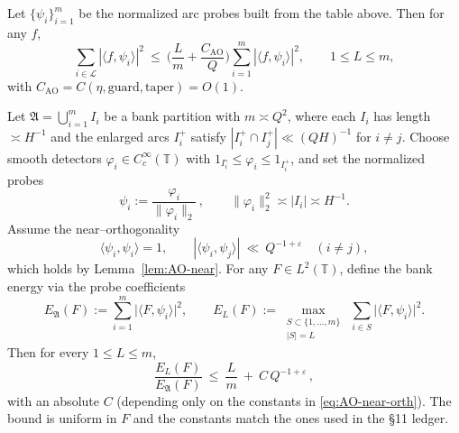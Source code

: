 \begin{proposition}\label{prop:AO-const}
Let $\{\psi_i\}_{i=1}^m$ be the normalized arc probes built from the table above. 
Then for any $f$,
\[
\sum_{i\in\mathcal L} |\langle f,\psi_i\rangle|^2
\ \le\
\Big(\frac{L}{m}+\frac{C_{\mathrm{AO}}}{Q}\Big)
\sum_{i=1}^{m} |\langle f,\psi_i\rangle|^2,
\qquad 1\le L\le m,
\]
with $C_{\mathrm{AO}}=C(\eta,\text{guard},\text{taper})=O(1)$.
\end{proposition}


\begin{theorem}\label{thm:AO-dispersion-nohot}
Let $\mathfrak A=\bigcup_{i=1}^{m} I_i$ be a bank partition with $m\asymp Q^2$, where each $I_i$ has length $\asymp H^{-1}$ and the enlarged arcs $I_i^+$ satisfy 
$|I_i^+\cap I_j^+|\ll (QH)^{-1}$ for $i\neq j$.
Choose smooth detectors $\varphi_i\in C_c^\infty(\mathbb T)$ with 
$1_{I_i^\circ}\le \varphi_i\le 1_{I_i^+}$, and set the normalized probes
\[
\psi_i:=\frac{\varphi_i}{\|\varphi_i\|_{2}}\,,\qquad 
\|\varphi_i\|_2^2\asymp |I_i|\asymp H^{-1}.
\]
Assume the near–orthogonality
\begin{equation}\label{eq:AO-near-orth}
\langle \psi_i,\psi_i\rangle=1,\qquad 
|\langle \psi_i,\psi_j\rangle|\ \ll\ Q^{-1+\varepsilon}\quad (i\ne j),
\end{equation}
which holds by Lemma~\ref{lem:AO-near}. 
For any $F\in L^2(\mathbb T)$, define the bank energy via the probe coefficients
\[
E_{\mathfrak A}(F):=\sum_{i=1}^{m} \big|\langle F,\psi_i\rangle\big|^2,
\qquad 
E_{L}(F):=\max_{\substack{S\subset\{1,\dots,m\}\\ |S|=L}}\ \sum_{i\in S} \big|\langle F,\psi_i\rangle\big|^2 .
\]
Then for every $1\le L\le m$,
\begin{equation}
\frac{E_{L}(F)}{E_{\mathfrak A}(F)}
\ \le\ \frac{L}{m}\ +\ C\,Q^{-1+\varepsilon}\,,
\end{equation}
with an absolute $C$ (depending only on the constants in \eqref{eq:AO-near-orth}). 
The bound is uniform in $F$ and the constants match the ones used in the §11 ledger.
\end{theorem}

